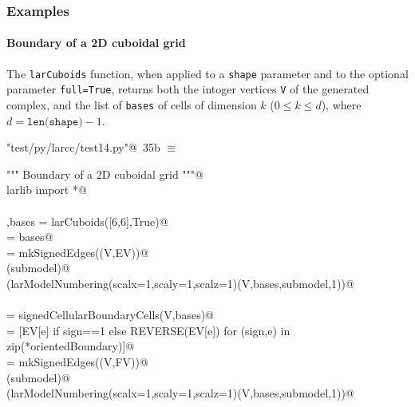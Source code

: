 \documentclass[11pt,oneside]{article}    %
\begin{document}
\subsubsection{Examples}

\paragraph{Boundary of a 2D cuboidal grid}
The \texttt{larCuboids} function, when applied to a \texttt{shape} parameter and to the optional parameter \texttt{full=True}, returns both the intoger vertices \texttt{V} of the generated complex, and the list of \texttt{bases} of cells of dimension $k$ ($0\leq k\leq d$), where $d = \texttt{len(shape)}-1$.

\begin{flushleft} \small \label{scrap56}
\protect{}\verb@"test/py/larcc/test14.py"@\nobreak\ {\footnotesize 35b }$\equiv$
\vspace{-1ex}
\begin{list}{}{} \item
\mbox{}\verb@""" Boundary of a 2D cuboidal grid """@\\
\mbox{}\verb@from larlib import *@\\
\mbox{}\verb@@\\
\mbox{}\verb@V,bases = larCuboids([6,6],True)@\\
\mbox{}\verb@[VV,EV,FV] = bases@\\
\mbox{}\verb@submodel = mkSignedEdges((V,EV))@\\
\mbox{}\verb@VIEW(submodel)@\\
\mbox{}\verb@VIEW(larModelNumbering(scalx=1,scaly=1,scalz=1)(V,bases,submodel,1))@\\
\mbox{}\verb@@\\
\mbox{}\verb@orientedBoundary = signedCellularBoundaryCells(V,bases)@\\
\mbox{}\verb@FV = [EV[e] if sign==1 else REVERSE(EV[e])  for (sign,e) in zip(*orientedBoundary)]@\\
\mbox{}\verb@submodel = mkSignedEdges((V,FV))@\\
\mbox{}\verb@VIEW(submodel)@\\
\mbox{}\verb@VIEW(larModelNumbering(scalx=1,scaly=1,scalz=1)(V,bases,submodel,1))@\\
\mbox{}\verb@@{\NWsep}
\end{list}
\vspace{-2ex}
\end{flushleft}
\end{document}
